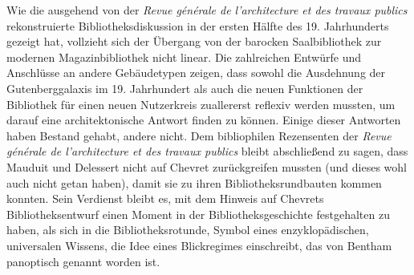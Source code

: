 Wie die ausgehend von der \emph{Revue générale de l'architecture et des
travaux publics} rekonstruierte Bibliotheksdiskussion in der ersten
Hälfte des 19. Jahrhunderts gezeigt hat, vollzieht sich der Übergang von
der barocken Saalbibliothek zur modernen Magazinbibliothek nicht linear.
Die zahlreichen Entwürfe und Anschlüsse an andere Gebäudetypen zeigen,
dass sowohl die Ausdehnung der Gutenberggalaxis im 19. Jahrhundert als
auch die neuen Funktionen der Bibliothek für einen neuen Nutzerkreis
zuallererst reflexiv werden mussten, um darauf eine architektonische
Antwort finden zu können. Einige dieser Antworten haben Bestand gehabt,
andere nicht. Dem bibliophilen Rezensenten der \emph{Revue générale de
l'architecture et des travaux publics} bleibt abschließend zu sagen,
dass Mauduit und Delessert nicht auf Chevret zurückgreifen mussten (und
dieses wohl auch nicht getan haben), damit sie zu ihren
Bibliotheksrundbauten kommen konnten. Sein Verdienst bleibt es, mit dem
Hinweis auf Chevrets Bibliotheksentwurf einen Moment in der
Bibliotheksgeschichte festgehalten zu haben, als sich in die
Bibliotheksrotunde, Symbol eines enzyklopädischen, universalen Wissens,
die Idee eines Blickregimes einschreibt, das von Bentham panoptisch
genannt worden ist.
